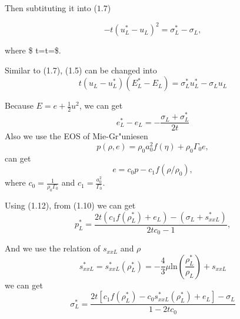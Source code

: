 \documentclass[11pt]{article}
\begin{document}
Then subtituting it into (\(1.7\))

\begin{equation}\tag{1.8}
  -t(u^*_L-u_L)^2 = \sigma^*_L-\sigma_L,
\end{equation}

where \$ t=t=\$.

Similar to (1.7), (1.5) can be changed into
\[ \tag{1.9} t(u_L-u^*_L)(E^*_L-E_L) =\sigma^*_L u^*_L-\sigma_Lu_L
\]

    Because \(E = e+\frac{1}{2}u^2\), we can get \[ \tag{1.10}
e_L^* - e_L = - \frac{\sigma_L +\sigma_L^*}{2t}
\] Also we use the EOS of Mie-Gr"uniesen\\
\[\tag{1.11}
  p(\rho,e) = \rho_0 a_0^2f(\eta)+ \rho_0 \Gamma_0 e,
\] can get \[ \tag{1.12}
  e=c_0 p-c_1f(\rho/\rho_0),
\] where \(c_0=\frac{1}{\rho_0\Gamma_0}\) and
\(c_1=\frac{a_0^2}{\Gamma_0}\).

Using (1.12), from (1.10) we can get \[ \tag{1.13}
 p^*_L= \frac{2t(c_1f(\rho^*_L)+e_L)-(\sigma_L+s^*_{xxL})}{2tc_0-1},
\]

    And we use the relation of \(s_{xxL}\) and \(\rho\)
\[  s_{xxL}^*=s_{xxL}^*(\rho_L^*)=-\frac{4}{3}\mu\text{ln}(\frac{\rho^*_{L}}{\rho_{L}})+s_{xxL}
\] we can get
\[ \tag{1.14} \sigma_L^*  = \frac{2t[c_1f(\rho^*_L)-c_0 s_{xxL}^*(\rho^*_L)+e_L] -\sigma_L}{1-2tc_0}\]
\end{document}
